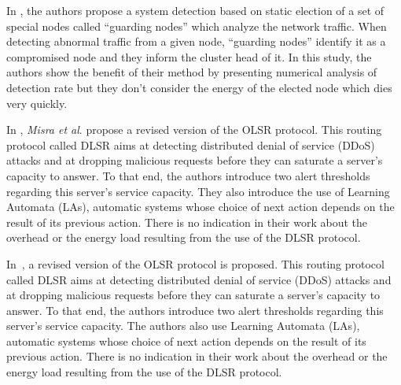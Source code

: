 In
\cite{LC08},
the authors propose a system detection based on static election of a set of special nodes called ``guarding nodes'' which analyze the network traffic.
When detecting abnormal traffic from a given node, ``guarding nodes'' identify it as a compromised node and they inform the cluster head of it.
In this study, the authors show the benefit of their method by presenting numerical analysis of detection rate but they don't consider the energy of the elected node which dies very quickly.



In
\cite{MKASF10},
\textit{Misra et al}. propose a revised version of the OLSR protocol.
This routing protocol called DLSR aims at detecting distributed denial of service (DDoS) attacks and at dropping malicious requests before they can saturate a server's capacity to answer.
To that end, the authors introduce two alert thresholds regarding this server's service capacity.
They also introduce the use of Learning Automata (LAs), automatic systems whose choice of next action depends on the result of its previous action.
There is no indication in their work about the overhead or the energy load resulting from the use of the DLSR protocol.

In~\cite{MKASF10}, a revised version of the OLSR protocol is proposed.
This routing protocol called DLSR aims at detecting distributed denial of service (DDoS) attacks and at dropping malicious requests before they can saturate a server's capacity to answer.
To that end, the authors introduce two alert thresholds regarding this server's service capacity.
The authors also use Learning Automata (LAs), automatic systems whose choice of next action depends on the result of its previous action.
There is no indication in their work about the overhead or the energy load resulting from the use of the DLSR protocol.



